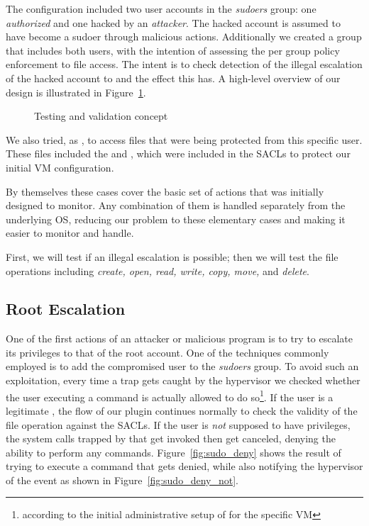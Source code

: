 \par The configuration included two user accounts in the \emph{sudoers} group: one \emph{authorized} and one hacked by an \emph{attacker}. The hacked account is assumed to have become a sudoer through malicious actions. Additionally we created a group that includes both users, with the intention of assessing the per group policy enforcement to file access. The intent is to check detection of the illegal escalation of the hacked account to  and the effect this has. A high-level overview of our design is illustrated in Figure~\ref{fig:attack}. 

\begin{figure}[ht]
	\centering
	
	\caption{Testing and validation concept}
	\label{fig:attack}
\end{figure} 

\par We also tried, as , to access files that were being protected from this specific user. These files included the  and , which were included in the \acp{SACL} to protect our initial \ac{VM} configuration.

\par By themselves these cases cover the basic set of actions that  was initially designed to monitor. Any combination of them is handled separately from the underlying \ac{OS}, reducing our problem to these elementary cases and making it easier to monitor and handle.

\par First, we will test if an illegal  escalation is possible; then we will test the file operations including \emph{create, open, read, write, copy, move,} and \emph{delete}.

\subsection{Root Escalation}

\par One of the first actions of an attacker or malicious program is to try to escalate its privileges to that of the root account. One of the techniques commonly employed is to add the compromised user to the \emph{sudoers} group. To avoid such an exploitation, every time a trap gets caught by the hypervisor we checked whether the user executing a  command is actually allowed to do so\footnote{according to the initial administrative setup of  for the specific \ac{VM}}. If the user is a legitimate , the flow of our plugin continues normally to check the validity of the file operation against the \acp{SACL}. If the user is \emph{not} supposed to have  privileges, the system calls trapped by  that get invoked then get canceled, denying the ability to perform any  commands. Figure~\ref{fig:sudo_deny} shows the result of trying to execute a  command that gets denied, while also notifying the hypervisor of the event as shown in Figure~\ref{fig:sudo_deny_not}.

